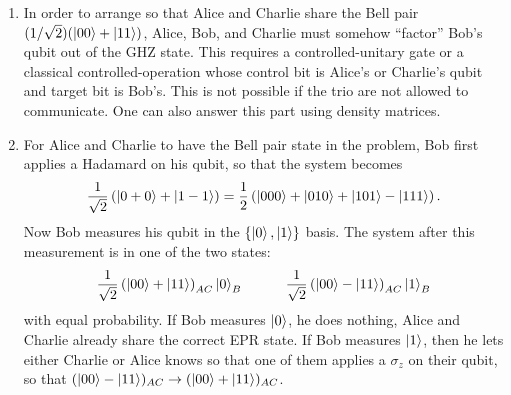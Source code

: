 \documentclass{article}
\theoremstyle{definition}
\newcommand{\f}[2]{\frac{#1}{#2}}
\newcommand{\lp}{\left(}
\newcommand{\rp}{\right)}
\begin{document}
\begin{enumerate}[label=(\alph*)]
	
	\item In order to arrange so that Alice and Charlie share the Bell pair $(1/\sqrt{2})(\ket{00} + \ket{11})$, Alice, Bob, and Charlie must somehow ``factor'' Bob's qubit out of the GHZ state. This requires a controlled-unitary gate or a classical controlled-operation whose control bit is Alice's or Charlie's qubit and target bit is Bob's. This is not possible if the trio are not allowed to communicate. One can also answer this part using density matrices. 
	
	\item For Alice and Charlie to have the Bell pair state in the problem, Bob first applies a Hadamard on his qubit, so that the system becomes
	\begin{align*}
		\f{1}{\sqrt{2}}\lp \ket{0+0} + \ket{1-1} \rp = \f{1}{2}\lp \ket{000} + \ket{010} + \ket{101} - \ket{111}  \rp.
	\end{align*}
	Now Bob measures his qubit in the $\{ \ket{0}, \ket{1}  \}$ basis. The system after this measurement is in one of the two states:
	\begin{align*}
		\f{1}{\sqrt{2}}\lp \ket{00} + \ket{11} \rp_{AC}\ket{0}_B \quad\quad\quad \f{1}{\sqrt{2}}\lp \ket{00} - \ket{11} \rp_{AC} \ket{1}_B
	\end{align*}
	with equal probability. If Bob measures $\ket{0}$, he does nothing, Alice and Charlie already share the correct EPR state. If Bob measures $\ket{1}$, then he lets either Charlie or Alice knows so that one of them applies a $\sigma_z$ on their qubit, so that $(\ket{00} - \ket{11})_{AC} \to (\ket{00} + \ket{11})_{AC}$. 
\end{enumerate}
\end{document}
